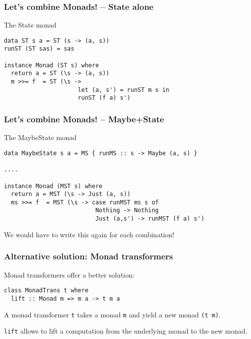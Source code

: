 \documentclass[pdftex,aspectratio=169]{beamer}
\begin{document}
\begin{frame}[fragile]
  \frametitle{Let's combine Monads! -- State alone}

  \begin{block}{The State monad}
\begin{lstlisting}
data ST s a = ST (s -> (a, s))
runST (ST sas) = sas

instance Monad (ST s) where
  return a = ST (\s -> (a, s))
  m >>= f  = ST (\s ->
                     let (a, s') = runST m s in
                     runST (f a) s')
\end{lstlisting}
  \end{block}
\end{frame}

\begin{frame}[fragile]
  \frametitle{Let's combine Monads! -- Maybe+State}
  \begin{block}{The MaybeState monad}
      \begin{lstlisting}
data MaybeState s a = MS { runMS :: s -> Maybe (a, s) }

....

instance Monad (MST s) where
  return a = MST (\s -> Just (a, s))
  ms >>= f  = MST (\s -> case runMST ms s of
                          Nothing -> Nothing
                          Just (a,s') -> runMST (f a) s')
      \end{lstlisting}
    \end{block}
    \pause
    We would have to write this again for each combination!
\end{frame}

\begin{frame}[fragile]
  \frametitle{Alternative solution: Monad transformers}

  Monad transformers offer a better solution:
  \begin{block}{}
\begin{lstlisting}
class MonadTrans t where
  lift :: Monad m => m a -> t m a
\end{lstlisting}

\end{block}

A monad transformer \lstinline{t} takes a monad \lstinline{m} and yield a new monad
\lstinline{(t m)}.

\lstinline{lift} allows to lift a computation from the underlying monad to the new monad.
\end{frame}
\end{document}
